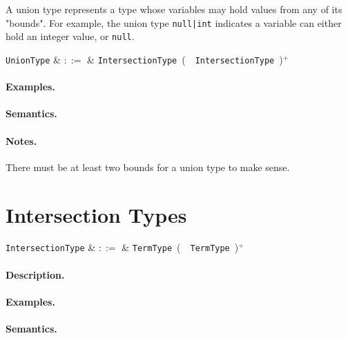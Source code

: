 A union type represents a type whose variables may hold values from any of its "bounds". For example, the union type \lstinline{null|int} indicates a variable can either hold an integer value, or \lstinline{null}. 

\begin{syntax}
  \verb+UnionType+ & $::=$ & \verb+IntersectionType+\ \big(\ \token{|}\ \verb+IntersectionType+\
  \big)$^+$\\
\end{syntax}

\paragraph{Examples.}

\paragraph{Semantics.}

\paragraph{Notes.}  There must be at least two bounds for a union type to make sense.


\section{Intersection Types}

\begin{syntax}
  \verb+IntersectionType+ & $::=$ & \verb+TermType+\ \big(\ \token{\&}\ \verb+TermType+\
  \big)$^+$\\
\end{syntax}

\paragraph{Description.}

\paragraph{Examples.}

\paragraph{Semantics.}

